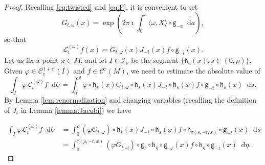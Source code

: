 \documentclass[11pt,letterpaper]{amsart}
\newcommand \cI {{\mathcal I}}
\newcommand \cL {{\mathcal L}}
\newcommand \cC {{\mathscr{C}}}
\newcommand{\horo}{\mathsf{h}}
\newcommand{\geo}{\mathsf{g}}
\newcommand*{\diff}{\mathop{}\!\mathrm{d}}
\theoremstyle{definition}
\begin{document}
\begin{proof} Recalling \eqref{eq:twisted} and \eqref{eq:F}, it is convenient to set 
\begin{equation}\label{eq:G}
G_{t,\omega}(x)=\exp\left( 2\pi \imath \int_0^t \langle \omega, X\rangle\circ \geo_{-a}\diff a  \right),
\end{equation}
so that 
\begin{equation}\label{eq:TO}
\cL^{(\omega)}_t f(x)= G_{t,\omega}(x)J_{-t}(x)f\circ \geo_{-t}(x).
\end{equation}
Let us fix a point $x\in M$, and let $I\in \cI_\rho$ be the segment $\{\horo_s(x) : s \in (0,\rho)\}$. Given $\varphi\in \cC_c^{1+\alpha}(I)$ and $f\in \cC^r(M)$, we need to estimate the absolute value of
\[
\int_I \varphi \cL^{(\omega)}_t f \diff  U =  \int_0^\rho \varphi\circ \horo_s(x)   G_{t,\omega} \circ \horo_s(x) J_{-t}\circ \horo_s(x)f\circ \geo_{-t}\circ \horo_s(x)\diff s.
\]
By Lemma \ref{lem:renormalization} and changing variables (recalling the definition of $J_t$ in Lemma \ref{lemma:Jacobi}) we have

\begin{equation}\label{eq:int1}
\begin{split}
\int_I \varphi \cL^{(\omega)}_t f \diff  U &= \int_0^\rho (\varphi G_{t,\omega})\circ \horo_s(x) J_{-t}\circ \horo_s(x) f\circ \horo_{\tau(s,-t,x)}\circ \geo_{-t}(x)  \diff s\\
&=  \int_0^{\tau(\rho,-t,x)}  (\varphi G_{t,\omega})\circ \geo_t\circ \horo_\eta\circ \geo_{-t}(x) f\circ \horo_\eta \circ \geo_{-t}(x)\diff \eta.
\end{split}
\end{equation}


\end{proof}
\end{document}
